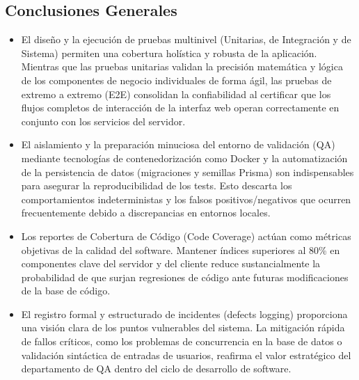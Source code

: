 \documentclass{article}
\begin{document}
\subsection{Conclusiones Generales}
\begin{itemize}
    \item El diseño y la ejecución de pruebas multinivel (Unitarias, de Integración y de Sistema) permiten una cobertura holística y robusta de la aplicación. Mientras que las pruebas unitarias validan la precisión matemática y lógica de los componentes de negocio individuales de forma ágil, las pruebas de extremo a extremo (E2E) consolidan la confiabilidad al certificar que los flujos completos de interacción de la interfaz web operan correctamente en conjunto con los servicios del servidor.
    \item El aislamiento y la preparación minuciosa del entorno de validación (QA) mediante tecnologías de contenedorización como Docker y la automatización de la persistencia de datos (migraciones y semillas Prisma) son indispensables para asegurar la reproducibilidad de los tests. Esto descarta los comportamientos indeterministas y los falsos positivos/negativos que ocurren frecuentemente debido a discrepancias en entornos locales.
    \item Los reportes de Cobertura de Código (Code Coverage) actúan como métricas objetivas de la calidad del software. Mantener índices superiores al 80\% en componentes clave del servidor y del cliente reduce sustancialmente la probabilidad de que surjan regresiones de código ante futuras modificaciones de la base de código.
    \item El registro formal y estructurado de incidentes (defects logging) proporciona una visión clara de los puntos vulnerables del sistema. La mitigación rápida de fallos críticos, como los problemas de concurrencia en la base de datos o validación sintáctica de entradas de usuarios, reafirma el valor estratégico del departamento de QA dentro del ciclo de desarrollo de software.
\end{itemize}
\end{document}

